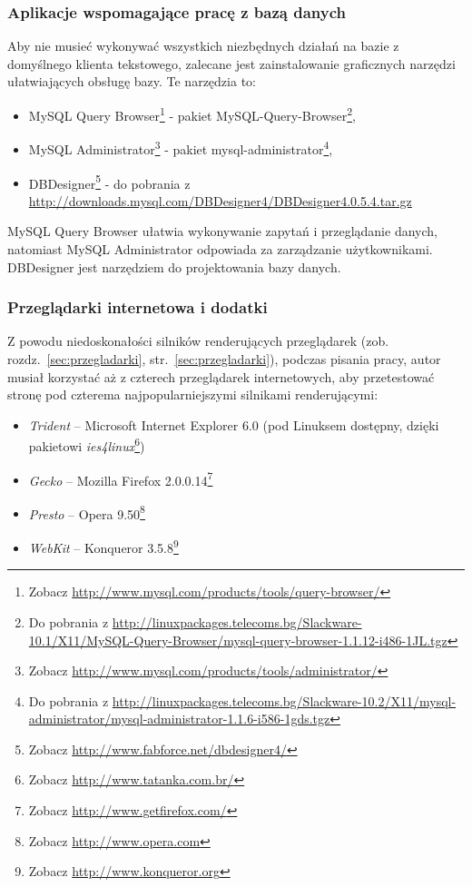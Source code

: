\documentclass[a4paper,12pt,oneside]{report}
\begin{document}
\subsubsection{Aplikacje wspomagające pracę z bazą danych}
\label{subsub:querybrowser}
Aby nie musieć wykonywać wszystkich niezbędnych działań na bazie z domyślnego klienta tekstowego, zalecane jest zainstalowanie graficznych narzędzi ułatwiających obsługę bazy. Te narzędzia to:
\begin{itemize}
  \item MySQL Query Browser\footnote{Zobacz \url{http://www.mysql.com/products/tools/query-browser/}} - pakiet MySQL-Query-Browser\footnote{Do pobrania z \url{http://linuxpackages.telecoms.bg/Slackware-10.1/X11/MySQL-Query-Browser/mysql-query-browser-1.1.12-i486-1JL.tgz}},
  \item MySQL Administrator\footnote{Zobacz \url{http://www.mysql.com/products/tools/administrator/}} - pakiet mysql-administrator\footnote{Do pobrania z \url{http://linuxpackages.telecoms.bg/Slackware-10.2/X11/mysql-administrator/mysql-administrator-1.1.6-i586-1gds.tgz}},
  \item DBDesigner\footnote{Zobacz \url{http://www.fabforce.net/dbdesigner4/}} - do pobrania z \url{http://downloads.mysql.com/DBDesigner4/DBDesigner4.0.5.4.tar.gz}
\end{itemize}
MySQL Query Browser ułatwia wykonywanie zapytań i przeglądanie danych, natomiast MySQL Administrator odpowiada za zarządzanie użytkownikami. DBDesigner jest narzędziem do projektowania bazy danych.

\subsubsection{Przeglądarki internetowa i dodatki}
\label{subsub:browser}
Z powodu niedoskonałości silników renderujących przeglądarek (zob. rozdz.~\ref{sec:przegladarki}, str.~\ref{sec:przegladarki}), podczas pisania pracy, autor musiał korzystać aż z czterech przeglądarek internetowych, aby przetestować stronę pod czterema najpopularniejszymi silnikami renderującymi:
\begin{itemize}
  \item \emph{Trident} -- Microsoft Internet Explorer 6.0 (pod Linuksem dostępny, dzięki pakietowi \emph{ies4linux}\footnote{Zobacz \url{http://www.tatanka.com.br/}})
  \item \emph{Gecko} -- Mozilla Firefox 2.0.0.14\footnote{Zobacz \url{http://www.getfirefox.com/}}
  \item \emph{Presto} -- Opera 9.50\footnote{Zobacz \url{http://www.opera.com}}
  \item \emph{WebKit} -- Konqueror 3.5.8\footnote{Zobacz \url{http://www.konqueror.org}}
\end{itemize}
\end{document}
